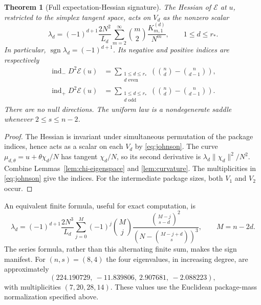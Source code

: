 \documentclass[11pt]{article}
\numberwithin{equation}{section}
\newtheorem{theorem}{Theorem}[section]
\theoremstyle{remark}
\newcommand{\1}{\mathbf 1}
\begin{document}
\begin{theorem}[Full expectation-Hessian signature]\label{thm:hessian}
The Hessian of $\mathcal E$ at $u$, restricted to the simplex tangent space, acts on $V_d$ as the nonzero scalar
\begin{equation}\label{eq:hessian-eigenvalue}
 \lambda_d=(-1)^{d+1}\frac{2N^2}{L_d}
 \sum_{m=2}^{\infty}\binom m2\frac{K^{(d)}_{m,1}}{N^m},
 \qquad 1\leq d\leq r_*.
\end{equation}
In particular, $\operatorname{sgn}\lambda_d=(-1)^{d+1}$. Its negative and positive indices are respectively
\begin{align}
 \operatorname{ind}_{-}D^2\mathcal E(u)
 &=\sum_{\substack{1\leq d\leq r_*\\d\text{ even}}}
       \left(\binom nd-\binom n{d-1}\right),\label{eq:negative-index}\\
 \operatorname{ind}_{+}D^2\mathcal E(u)
 &=\sum_{\substack{1\leq d\leq r_*\\d\text{ odd}}}
       \left(\binom nd-\binom n{d-1}\right).\label{eq:positive-index}
\end{align}
There are no null directions. The uniform law is a nondegenerate saddle whenever $2\leq s\leq n-2$.
\end{theorem}

\begin{proof}
The Hessian is invariant under simultaneous permutation of the package indices, hence acts as a scalar on each $V_d$ by \eqref{eq:johnson}. The curve $\mu_{d,\theta}=u+\theta\chi_d/N$ has tangent $\chi_d/N$, so its second derivative is
$\lambda_d\|\chi_d\|^2/N^2$.
Combine Lemmas~\ref{lem:chi-eigenspace} and \ref{lem:curvature}. The multiplicities in \eqref{eq:johnson} give the indices. For the intermediate package sizes, both $V_1$ and $V_2$ occur.
\end{proof}

An equivalent finite formula, useful for exact computation, is
\begin{equation}\label{eq:hessian-finite}
 \lambda_d=(-1)^{d+1}\frac{2N^3}{L_d}
 \sum_{j=0}^{M}(-1)^j\binom Mj
 \frac{\binom{M-j}{s-d}^{2}}
      {\left(N-\binom{M-j+d}s\right)^3},
 \qquad M=n-2d.
\end{equation}
The series formula, rather than this alternating finite sum, makes the sign manifest. For $(n,s)=(8,4)$ the four eigenvalues, in increasing degree, are approximately
\[
 (224.190729,\ -11.839806,\ 2.907681,\ -2.088223),
\]
with multiplicities $(7,20,28,14)$. These values use the Euclidean package-mass normalization specified above.
\end{document}
